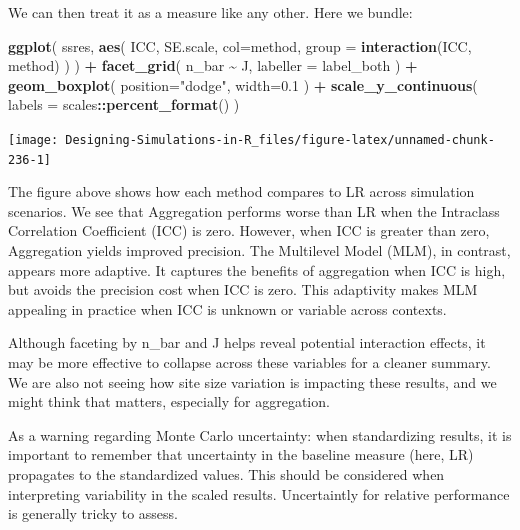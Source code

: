\documentclass[
]{book}
\newenvironment{Shaded}{\begin{snugshade}}{\end{snugshade}}
\newcommand{\AttributeTok}[1]{\textcolor[rgb]{0.13,0.29,0.53}{#1}}
\newcommand{\FloatTok}[1]{\textcolor[rgb]{0.00,0.00,0.81}{#1}}
\newcommand{\FunctionTok}[1]{\textcolor[rgb]{0.13,0.29,0.53}{\textbf{#1}}}
\newcommand{\NormalTok}[1]{#1}
\newcommand{\SpecialCharTok}[1]{\textcolor[rgb]{0.81,0.36,0.00}{\textbf{#1}}}
\newcommand{\StringTok}[1]{\textcolor[rgb]{0.31,0.60,0.02}{#1}}
\begin{document}
We can then treat it as a measure like any other.
Here we bundle:

\begin{Shaded}
\begin{Highlighting}[]
\FunctionTok{ggplot}\NormalTok{( ssres, }\FunctionTok{aes}\NormalTok{( ICC, SE.scale, }\AttributeTok{col=}\NormalTok{method,}
                    \AttributeTok{group =} \FunctionTok{interaction}\NormalTok{(ICC, method) ) ) }\SpecialCharTok{+}
  \FunctionTok{facet\_grid}\NormalTok{( n\_bar }\SpecialCharTok{\textasciitilde{}}\NormalTok{  J, }\AttributeTok{labeller =}\NormalTok{ label\_both ) }\SpecialCharTok{+}
  \FunctionTok{geom\_boxplot}\NormalTok{( }\AttributeTok{position=}\StringTok{"dodge"}\NormalTok{, }\AttributeTok{width=}\FloatTok{0.1}\NormalTok{ ) }\SpecialCharTok{+}
  \FunctionTok{scale\_y\_continuous}\NormalTok{( }\AttributeTok{labels =}\NormalTok{ scales}\SpecialCharTok{::}\FunctionTok{percent\_format}\NormalTok{() )}
\end{Highlighting}
\end{Shaded}

\begin{center}\texttt{[image: Designing-Simulations-in-R\_files/figure-latex/unnamed-chunk-236-1]} \end{center}

The figure above shows how each method compares to LR across simulation scenarios. We see that Aggregation performs worse than LR when the Intraclass Correlation Coefficient (ICC) is zero. However, when ICC is greater than zero, Aggregation yields improved precision.
The Multilevel Model (MLM), in contrast, appears more adaptive. It captures the benefits of aggregation when ICC is high, but avoids the precision cost when ICC is zero. This adaptivity makes MLM appealing in practice when ICC is unknown or variable across contexts.

Although faceting by n\_bar and J helps reveal potential interaction effects, it may be more effective to collapse across these variables for a cleaner summary.
We are also not seeing how site size variation is impacting these results, and we might think that matters, especially for aggregation.

As a warning regarding Monte Carlo uncertainty: when standardizing results, it is important to remember that uncertainty in the baseline measure (here, LR) propagates to the standardized values. This should be considered when interpreting variability in the scaled results.
Uncertaintly for relative performance is generally tricky to assess.
\end{document}
